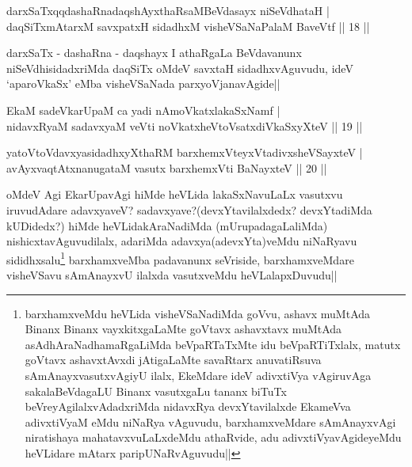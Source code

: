 
\begin{shl}
darxSaTxqqdashaRnadaqshAyxthaRsaMBeVdasayx niSeVdhataH |\\
daqSiTxmAtarxM savxpatxH sidadhxM visheVSaNaPalaM BaveVtf \hfill || 18 ||
\end{shl}

\begin{artha}
darxSaTx - dashaRna - daqshayx I athaRgaLa BeVdavanunx niSeVdhisidadxriMda daqSiTx oMdeV savxtaH sidadhxvAguvudu, ideV `aparoVkaSx' eMba visheVSaNada parxyoVjanavAgide||
\end{artha}


\begin{shl}
EkaM sadeVkarUpaM ca yadi nAmoVkatxlakaSxNamf |\\
nidavxRyaM sadavxyaM veVti noVkatxheVtoVsatxdiVkaSxyXteV \hfill || 19 ||
\end{shl}

\begin{shl}
yatoV\s toV\s davxyasidadhxyXthaRM barxhemxVteyxVtadivxsheVSayxteV |\\
avAyxvaqtAtxnanugataM vasutx barxhemxVti BaNayxteV \hfill || 20 ||
\end{shl}

\begin{artha}
oMdeV Agi EkarUpavAgi hiMde heVLida lakaSxNavuLaLx vasutxvu iruvudAdare adavxyaveV? sadavxyave?(devxYtavilalxdedx? devxYtadiMda kUDidedx?) hiMde heVLidakAraNadiMda (mUrupadagaLaliMda) nishicxtavAguvudilalx, adariMda adavxya(adevxYta)veMdu niNaRyavu sididhxsalu\footnote{barxhamxveMdu heVLida visheVSaNadiMda goVvu, ashavx muMtAda Binanx Binanx vayxkitxgaLaMte goVtavx ashavxtavx muMtAda asAdhAraNadhamaRgaLiMda beVpaRTaTxMte idu beVpaRTiTxlalx, matutx goVtavx ashavxtAvxdi jAtigaLaMte savaRtarx anuvatiRsuva sAmAnayxvasutxvAgiyU ilalx, EkeMdare ideV adivxtiVya vAgiruvAga sakalaBeVdagaLU Binanx vasutxgaLu tananx biTuTx beVreyAgilalxvAdadxriMda nidavxRya devxYtavilalxde EkameVva adivxtiVyaM eMdu niNaRya vAguvudu, barxhamxveMdare sAmAnayxvAgi niratishaya mahatavxvuLaLxdeMdu athaRvide, adu adivxtiVyavAgideyeMdu heVLidare mAtarx paripUNaRvAguvudu||} barxhamxveMba padavanunx seVriside, barxhamxveMdare visheVSavu sAmAnayxvU ilalxda vasutxveMdu heVLalapxDuvudu||
\end{artha}
